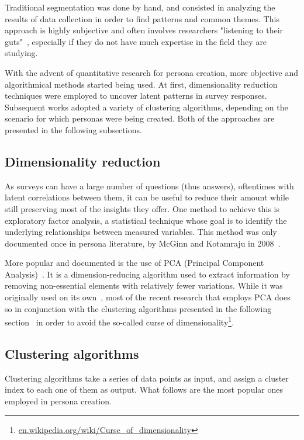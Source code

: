 Traditional segmentation was done by hand, and consisted in analyzing the results of data collection in order to find patterns and common themes. This approach is highly subjective and often involves researchers "listening to their guts"~\cite{mulder2007approaches}, especially if they do not have much expertise in the field they are studying.

With the advent of quantitative research for persona creation, more objective and algorithmical methods started being used. At first, dimensionality reduction techniques were employed to uncover latent patterns in survey responses. Subsequent works adopted a variety of clustering algorithms, depending on the scenario for which personas were being created. Both of the approaches are presented in the following subsections.

\subsection{Dimensionality reduction}
\label{subsec:dimrec}
As surveys can have a large number of questions (thus answers), oftentimes with latent correlations between them, it can be useful to reduce their amount while still preserving most of the insights they offer. One method to achieve this is exploratory factor analysis, a statistical technique whose goal is to identify the underlying relationships between measured variables. This method was only documented once in persona literature, by McGinn and Kotamraju in 2008~\cite{mcginn2008data}.

More popular and documented is the use of PCA (Principal Component Analysis)~\cite{salminen2021survey, sinha2003persona, tu2010combine}. It is a dimension-reducing algorithm used to extract information by removing non-essential elements with relatively fewer variations. While it was originally used on its own~\cite{sinha2003persona, tu2010combine}, most of the recent research that employs PCA does so in conjunction with the clustering algorithms presented in the following section~\cite{salminen2021survey} in order to avoid the so-called curse of dimensionality\footnote{\url{en.wikipedia.org/wiki/Curse_of_dimensionality}}.

\subsection{Clustering algorithms}
\label{subsec:clustering}
Clustering algorithms take a series of data points as input, and assign a cluster index to each one of them as output. What follows are the most popular ones employed in persona creation.

